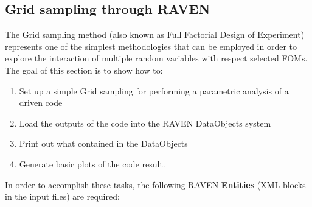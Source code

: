 \subsection{Grid sampling through RAVEN}
\label{sub:Gridexample}
The Grid sampling method (also known as Full Factorial Design of Experiment) represents one of the simplest methodologies that can be employed in order to explore the interaction of multiple random variables with respect
selected FOMs.
The goal of this section is to show how to:
 \begin{enumerate}
   \item Set up a simple Grid sampling for performing a parametric analysis of a driven code
   \item Load the outputs of the code into the RAVEN DataObjects system
   \item Print out what contained in the DataObjects
   \item Generate basic plots of the code result.
\end{enumerate}
In order to accomplish these tasks, the following RAVEN \textbf{Entities} (XML blocks in the input files) are required:

